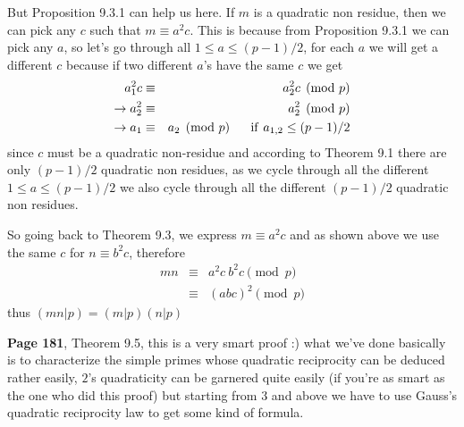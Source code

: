 \documentclass[aps,preprint,preprintnumbers,nofootinbib,showpacs,prd]{revtex4-1}
\newcommand{\nbea}{\begin{eqnarray*}}
\newcommand{\neea}{\end{eqnarray*}}
\begin{document}
But Proposition 9.3.1 can help us here. If $m$ is a quadratic non residue, then we can pick any $c$ such that $m \equiv a^2 c$. This is because from Proposition 9.3.1 we can pick any $a$, so let's go through all $1 \le a \le (p-1)/2$, for each $a$ we will get a different $c$ because if two different $a$'s have the same $c$ we get
%
\nbea
a^2_1 c & \equiv & a^2_2 c \pmod{p} \\
\to a^2_2 & \equiv & a^2_2 \pmod{p} \\
\to a_1 & \equiv & a_2 \pmod{p} ~~~~~{\rm if}~ a_{1,2} \le (p-1)/2
\neea
%
since $c$ must be a quadratic non-residue and according to Theorem 9.1 there are only $(p-1)/2$ quadratic non residues, as we cycle through all the different $1 \le a \le (p-1)/2$ we also cycle through all the different $(p-1)/2$ quadratic non residues.

So going back to Theorem 9.3, we express $m \equiv a^2 c$ and as shown above we use the same $c$ for $n \equiv b^2 c$, therefore
%
\nbea
mn & \equiv & a^2 c~ b^2 c \pmod{p} \\
& \equiv & (abc)^2 \pmod{p}
\neea
%
thus $(mn|p) = (m|p)(n|p)$

{\bf Page 181}, Theorem 9.5, this is a very smart proof :) what we've done basically is to characterize the simple primes whose quadratic reciprocity can be deduced rather easily, $2$'s quadraticity can be garnered quite easily (if you're as smart as the one who did this proof) but starting from 3 and above we have to use Gauss's quadratic reciprocity law to get some kind of formula.
\end{document}
